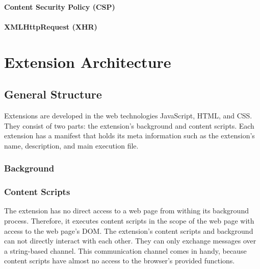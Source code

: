 \paragraph{Content Security Policy (CSP)}

\paragraph{XMLHttpRequest (XHR)}



\newpage
\section{Extension Architecture}
	
\subsection{General Structure}

	Extensions are developed in the web technologies JavaScript, HTML, and CSS. They consist of two parts: the extension's background and content scripts. Each extension has a manifest that holds its meta information such as the extension's name, description, and main execution file.
	
\subsubsection{Background} 

\subsubsection{Content Scripts}

	The extension has no direct access to a web page from withing its background process. Therefore, it executes content scripts in the scope of the web page with access to the web page's DOM. The extension's content scripts and background can not directly interact with each other. They can only exchange messages over a string-based channel. This communication channel comes in handy, because content scripts have almost no access to the browser's provided functions. 
	
